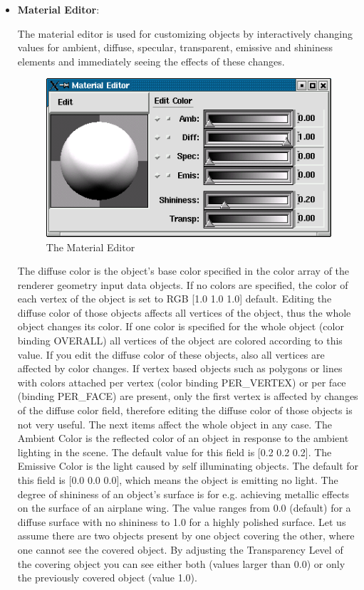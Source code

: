 \begin{itemize}
\item {\bf Material Editor}:

The material editor is used for customizing objects by interactively changing
values for ambient, diffuse, specular, transparent, emissive and shininess
elements and immediately seeing the effects of these changes.

 \latexonly
 \begin{figure}[htp]
  \begin{center}
   \includegraphics[scale=0.7]{renderer/pict/image16}
   \caption{The Material Editor}
	\label{fig63}
  \end{center}
 \end{figure}
 \endlatexonly



The diffuse color is the object's base color specified in the color array of
the renderer geometry input data objects. If no colors are specified, the color
of each vertex of the object is set to RGB [1.0 1.0 1.0] default. Editing the
diffuse color of those objects affects all vertices of the object, thus the
whole object changes its color. If one color is specified for the whole object
(color binding OVERALL) all vertices of the object are colored according to
this value. If you edit the diffuse color of these objects, also all vertices
are affected by color changes. If vertex based objects such as polygons or
lines with colors attached per vertex (color binding PER\_VERTEX) or per face
(binding PER\_FACE) are present, only the first vertex is affected by changes
of the diffuse color field, therefore editing the diffuse color of those
objects is not very useful. The next items affect the whole object in any
case. The Ambient Color is the reflected color of an object in response to
the ambient lighting in the scene. The default value for this field is [0.2 0.2 0.2].
The Emissive Color is the light caused by self illuminating objects.
The default for this field is [0.0 0.0 0.0], which means the object
is emitting no light. The degree of shininess of an object's surface
is for e.g. achieving metallic effects on the surface of an airplane
wing. The value ranges from 0.0 (default) for a diffuse surface with
no shininess to 1.0 for a highly polished surface. Let us assume there
are two objects present by one object covering the other, where one
cannot see the covered object. By adjusting the Transparency Level of
the covering object you can see either both (values larger than 0.0)
or only the previously covered object (value 1.0).


\end{itemize}
